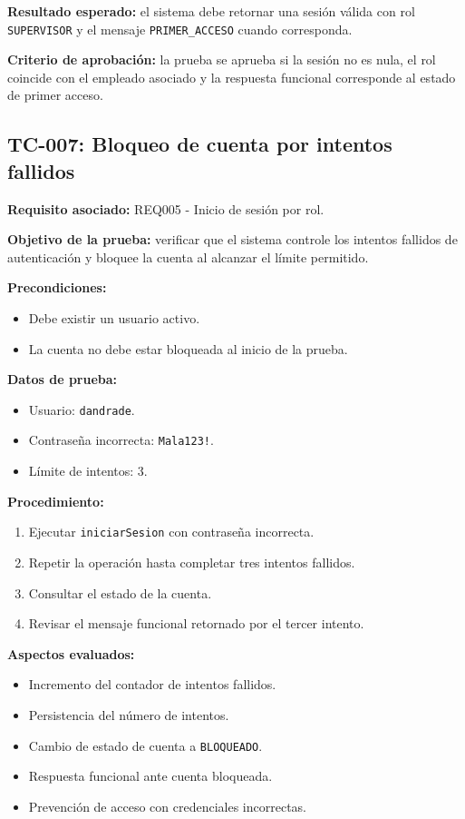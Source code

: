 \documentclass[12pt,a4paper]{article}
\begin{document}
\textbf{Resultado esperado:} el sistema debe retornar una sesión válida con rol \texttt{SUPERVISOR} y el mensaje \texttt{PRIMER\_ACCESO} cuando corresponda.

\textbf{Criterio de aprobación:} la prueba se aprueba si la sesión no es nula, el rol coincide con el empleado asociado y la respuesta funcional corresponde al estado de primer acceso.

\subsection{TC-007: Bloqueo de cuenta por intentos fallidos}

\textbf{Requisito asociado:} REQ005 - Inicio de sesión por rol.

\textbf{Objetivo de la prueba:} verificar que el sistema controle los intentos fallidos de autenticación y bloquee la cuenta al alcanzar el límite permitido.

\textbf{Precondiciones:}
\begin{itemize}[leftmargin=*]
    \item Debe existir un usuario activo.
    \item La cuenta no debe estar bloqueada al inicio de la prueba.
\end{itemize}

\textbf{Datos de prueba:}
\begin{itemize}[leftmargin=*]
    \item Usuario: \texttt{dandrade}.
    \item Contraseña incorrecta: \texttt{Mala123!}.
    \item Límite de intentos: 3.
\end{itemize}

\textbf{Procedimiento:}
\begin{enumerate}[leftmargin=*]
    \item Ejecutar \texttt{iniciarSesion} con contraseña incorrecta.
    \item Repetir la operación hasta completar tres intentos fallidos.
    \item Consultar el estado de la cuenta.
    \item Revisar el mensaje funcional retornado por el tercer intento.
\end{enumerate}

\textbf{Aspectos evaluados:}
\begin{itemize}[leftmargin=*]
    \item Incremento del contador de intentos fallidos.
    \item Persistencia del número de intentos.
    \item Cambio de estado de cuenta a \texttt{BLOQUEADO}.
    \item Respuesta funcional ante cuenta bloqueada.
    \item Prevención de acceso con credenciales incorrectas.
\end{itemize}
\end{document}
